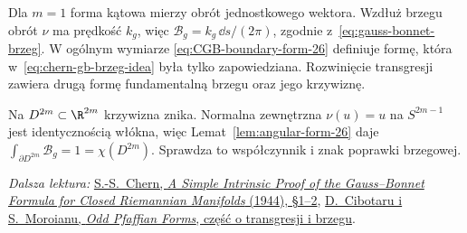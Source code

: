 Dla $m=1$ forma kątowa mierzy
obrót jednostkowego wektora.
Wzdłuż brzegu obrót $\nu$
ma prędkość $k_g$, więc
$\mathcal B_g=k_g\,\dd s/(2\pi)$,
zgodnie z~\eqref{eq:gauss-bonnet-brzeg}.
W ogólnym wymiarze
\eqref{eq:CGB-boundary-form-26}
definiuje formę, która
w~\eqref{eq:chern-gb-brzeg-idea}
była tylko zapowiedziana.
Rozwinięcie transgresji
zawiera drugą formę
fundamentalną brzegu
oraz jego krzywiznę.

\begin{przyklad}
\label{prz:CGB-ball-26}
Na $D^{2m}\subset\R^{2m}$
krzywizna znika. Normalna
zewnętrzna $\nu(u)=u$
na $S^{2m-1}$ jest
identycznością włókna,
więc Lemat~\ref{lem:angular-form-26}
daje $\int_{\partial D^{2m}}\mathcal B_g=1
=\chi(D^{2m})$.
Sprawdza to współczynnik
i znak poprawki brzegowej.
\end{przyklad}

\par\smallskip
{\footnotesize\noindent\emph{Dalsza lektura:}
\href{https://webhomes.maths.ed.ac.uk/~v1ranick/papers/chern7.pdf}
{S.-S.\ Chern, \emph{A Simple Intrinsic Proof of the
Gauss--Bonnet Formula for Closed Riemannian Manifolds}
(1944), §1--2},
\href{https://www.imar.ro/~sergium/fisiere/pfa.pdf}
{D.\ Cibotaru i S.\ Moroianu,
\emph{Odd Pfaffian Forms},
część o transgresji i brzegu}.\par}
